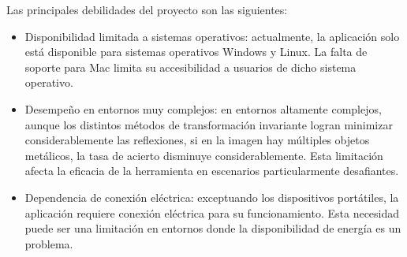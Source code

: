 Las principales debilidades del proyecto son las siguientes:

\begin{itemize}
    \item Disponibilidad limitada a sistemas operativos: actualmente, la aplicación solo está disponible para sistemas operativos Windows y Linux. La falta de soporte para Mac limita su accesibilidad a usuarios de dicho sistema operativo.
    \item Desempeño en entornos muy complejos: en entornos altamente complejos, aunque los distintos métodos de transformación invariante logran minimizar considerablemente las reflexiones, si en la imagen hay múltiples objetos metálicos, la tasa de acierto disminuye considerablemente. Esta limitación afecta la eficacia de la herramienta en escenarios particularmente desafiantes.
    \item Dependencia de conexión eléctrica: exceptuando los dispositivos portátiles, la aplicación requiere conexión eléctrica para su funcionamiento. Esta necesidad puede ser una limitación en entornos donde la disponibilidad de energía es un problema.
\end{itemize}

